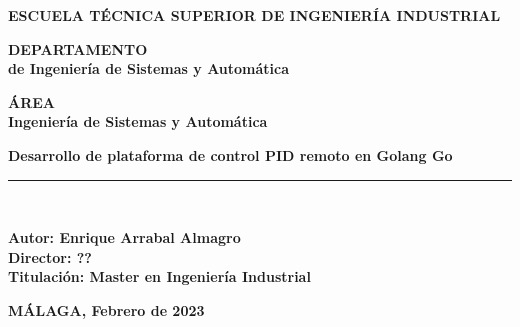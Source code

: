 \begin{center}
	\begin{large}
		\textbf {ESCUELA TÉCNICA SUPERIOR DE INGENIERÍA INDUSTRIAL\\}		
	\end{large}	
	\vspace*{0.5cm}
	\begin{large}
		\textbf {DEPARTAMENTO\\ de Ingeniería de Sistemas y Automática\\}		
	\end{large}	
	\vspace*{1cm}
	\begin{large}
		\textbf {ÁREA\\Ingeniería de Sistemas y Automática\\}		
	\end{large}	
	\vspace*{1cm}	
	\begin{LARGE}	
		\textbf {Desarrollo de plataforma de control PID remoto en Golang Go\\}
	\end{LARGE}
	\vspace*{0.3cm}
	\rule{5cm}{0.01cm}\\
	\vspace*{1cm}
	\begin{large}
		\textbf {Autor: Enrique Arrabal Almagro\\}
		\vspace*{0.5cm}
		\textbf {Director: ?? \\}
		\vspace*{1cm}
		\textbf{Titulación: Master en Ingeniería Industrial}
	\end{large}	
	\vspace*{3cm}
\begin{center}
\bf{MÁLAGA, Febrero de 2023}
\end{center}					
\end{center}
\thispagestyle{empty}


